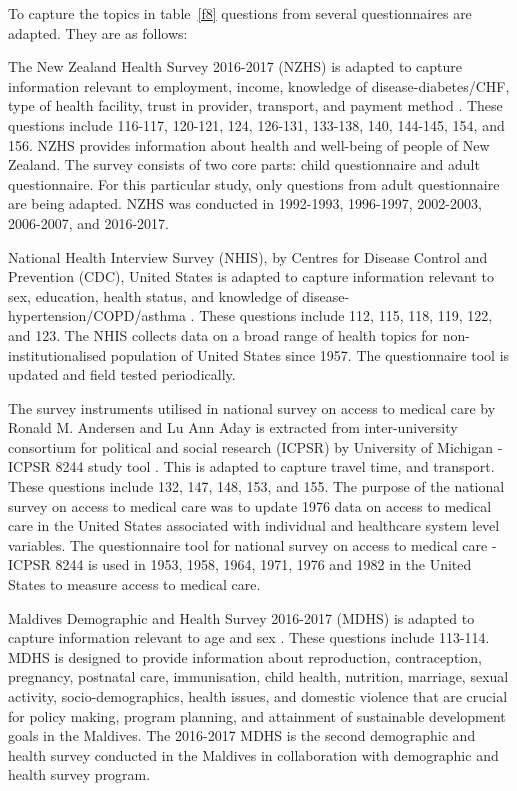 To capture the topics in table~\ref{f8} questions from several questionnaires are adapted. They are as follows:

The New Zealand Health Survey 2016-2017 (NZHS) is adapted to capture information relevant to employment, income, knowledge of disease-diabetes/CHF, type of health facility, trust in provider, transport, and payment method \cite{NZHS:Newzealand:2017}. These questions include 116-117, 120-121, 124, 126-131, 133-138, 140, 144-145, 154, and 156. NZHS provides information about health and well-being of people of New Zealand. The survey consists of two core parts: child questionnaire and adult questionnaire. For this particular study, only questions from adult questionnaire are being adapted. NZHS was conducted in 1992-1993, 1996-1997, 2002-2003, 2006-2007, and 2016-2017. 

National Health Interview Survey (NHIS), by Centres for Disease Control and Prevention (CDC), United States is adapted to capture information relevant to sex, education, health status, and knowledge of disease-hypertension/COPD/asthma \cite{Centre:disease:control}. These questions include 112, 115, 118, 119, 122, and 123. The NHIS collects data on a broad range of health topics for non-institutionalised population of United States since 1957. The questionnaire tool is updated and field tested periodically. 

The survey instruments utilised in national survey on access to medical care by Ronald M. Andersen and Lu Ann Aday is extracted from inter-university consortium for political and social research (ICPSR) by University of Michigan - ICPSR 8244 study tool \cite{Andersen:questionnaire:1982}. This is adapted to capture travel time, and transport. These questions include 132, 147, 148, 153, and 155. The purpose of the national survey on access to medical care was to update 1976 data on access to medical care in the United States associated with individual and healthcare system level variables. The questionnaire tool for national survey on access to medical care - ICPSR 8244 is used in 1953, 1958, 1964, 1971, 1976 and 1982 in the United States to measure access to medical care. 

Maldives Demographic and Health Survey 2016-2017 (MDHS) is adapted to capture information relevant to age and sex \cite{Maldives:demographichealthsurvey:2017}. These questions include 113-114. MDHS is designed to provide information about reproduction, contraception, pregnancy, postnatal care, immunisation, child health, nutrition, marriage, sexual activity, socio-demographics, health issues, and domestic violence that are crucial for policy making, program planning, and attainment of sustainable development goals in the Maldives. The 2016-2017 MDHS is the second demographic and health survey conducted in the Maldives in collaboration with demographic and health survey program. 

